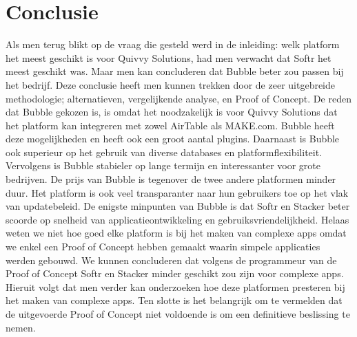 
\chapter{Conclusie}%
\label{ch:conclusie}

Als men terug blikt op de vraag die gesteld werd in de inleiding: welk platform het meest geschikt is voor Quivvy Solutions, had men verwacht dat Softr het meest geschikt was. Maar men kan concluderen dat Bubble beter zou passen bij het bedrijf. 
Deze conclusie heeft men kunnen trekken door de zeer uitgebreide methodologie; alternatieven, vergelijkende analyse, en Proof of Concept. De reden dat Bubble gekozen is, is omdat het noodzakelijk is voor Quivvy Solutions dat het platform
kan integreren met zowel AirTable als MAKE.com. Bubble heeft deze mogelijkheden en heeft ook een groot aantal plugins. Daarnaast is Bubble ook superieur op het gebruik van diverse databases en platformflexibiliteit.
Vervolgens is Bubble stabieler op lange termijn en interessanter voor grote bedrijven. De prijs van Bubble is tegenover de twee andere platformen minder duur. Het platform is ook veel transparanter naar hun 
gebruikers toe op het vlak van updatebeleid. De enigste minpunten van Bubble is dat Softr en Stacker beter scoorde op snelheid van applicatieontwikkeling en gebruiksvriendelijkheid. Helaas weten we niet hoe goed elke platform is bij het maken
van complexe apps omdat we enkel een Proof of Concept hebben gemaakt waarin simpele applicaties werden gebouwd. We kunnen concluderen dat volgens de programmeur van de Proof of Concept Softr en Stacker minder geschikt zou zijn voor complexe apps. Hieruit volgt dat men verder kan onderzoeken 
hoe deze platformen presteren bij het maken van complexe apps. Ten slotte is het belangrijk om te vermelden dat de uitgevoerde Proof of Concept niet voldoende is om een definitieve beslissing te nemen.



